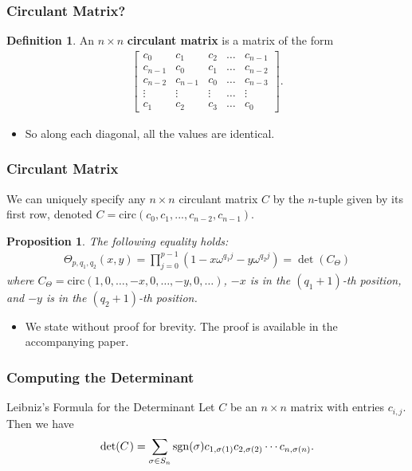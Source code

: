 \documentclass{beamer}
\theoremstyle{plain}
\newtheorem{Prop}[theorem]{Proposition}
\theoremstyle{definition}
\newtheorem{Def}[theorem]{Definition}
\theoremstyle{remark}
\newcommand{\bee}{\begin{equation}\begin{aligned}}
\newcommand{\eee}{\end{aligned}\end{equation}}
\renewcommand{\'}{\hspace{0.5mm}'}		%
\begin{document}
\begin{frame}
\frametitle{Circulant Matrix?}

\begin{Def}
	An $n \times n$ \textbf{circulant matrix} is a matrix of the 
	form
	\bee
		\begin{bmatrix}
			c_0 & c_1 & c_2 & \hdots & c_{n - 1} \\
			c_{n - 1} & c_0 & c_1 & \hdots & c_{n - 2} \\
			c_{n - 2} & c_{n - 1} & c_0 & \hdots & c_{n - 3} \\
			\vdots & \vdots & \vdots & \hdots & \vdots \\
			c_1 & c_2 & c_3 & \hdots & c_0
		\end{bmatrix}. 
	\eee
\end{Def}
\begin{itemize}
	\item So along each diagonal, all the values are identical. 
\end{itemize}

\end{frame}


\begin{frame}
\frametitle{Circulant Matrix}

We can uniquely specify any $n \times n$ circulant matrix $C$ by the $n$-tuple given by its first row, denoted $C = \mathrm{circ}(c_0, c_1, ..., c_{n - 2}, c_{n - 1})$. 

\begin{Prop}
	The following equality holds:
	\bee
		\Theta_{p,q_1,q_2}(x,y)
		= 
		\prod_{j = 0}^{p - 1}
		(1 - x\omega^{q_1 j} - y\omega^{q_2 j}) 
		= \det\left( C_{\Theta}\right)
	\eee
	 where 
	 $C_{\Theta} = 
	 \mathrm{circ}(1,0,\hdots,-x,0,\hdots,-y,0,\hdots)$, 
	 $-x$ is in the $(q_1 + 1)$-th position, 
	 and $-y$ is in the $(q_2 + 1)$-th position. 
\end{Prop}
\begin{itemize}
	\item We state without proof for brevity. 
	The proof is available
	in the accompanying paper. 
\end{itemize}

\end{frame}


\begin{frame}
\frametitle{Computing the Determinant}

\begin{block}{Leibniz's Formula for the Determinant}
	Let $C$ be an $n \times n$ matrix with entries
	$c_{i,j}$. Then we have
	\bee
		\det(C\hspace{0.25mm}) = \sum_{\sigma \in S_n} 
		\mathrm{sgn}(
		\sigma)c_{1,\sigma(1)}c_{2,\sigma(2)} 
		\cdots c_{n,\sigma(n)}. 
	\eee
\end{block}




\end{frame}
\end{document}
